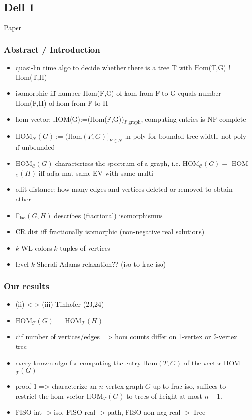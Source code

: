 \subsection{Dell 1}
Paper \cite{dell-1}

\subsubsection{Abstract / Introduction}

\begin{itemize}
    \item quasi-lin time algo to decide whether there is a tree T with Hom(T,G) != Hom(T,H)
    \item isomorphic iff number Hom(F,G) of hom from F to G equals number Hom(F,H) of hom from F to H
    \item hom vector: HOM(G):=(Hom(F,G))$_{F\text{ graph}}$, computing entries is NP-complete 
    \item HOM$_{\mathcal{F}}(G):=($Hom$(F,G))_{F\in\mathcal{F}}$ in poly for bounded tree width, not poly if unbounded
    \item HOM$_{\mathcal{C}}(G)$ characterizes the spectrum of a graph, i.e. HOM$_{\mathcal{C}}(G)=$ HOM$_{\mathcal{C}}(H)$ iff adja mat same EV with same multi
    \item edit distance: how many edges and vertices deleted or removed to obtain other
    \item F$_{\text{iso}}(G,H)$ describes (fractional) isomorphismus
    \item CR dist iff fractionally isomorphic (non-negative real solutions)
    \item $k$-WL colors $k$-tuples of vertices
    \item level-$k$-Sherali-Adams relaxation?? (iso to frac iso)
\end{itemize}

\subsubsection{Our results}

\begin{itemize}
    \item (ii) <-> (iii) Tinhofer (23,24)
    \item HOM$_{\mathcal{T}}(G)=$ HOM$_{\mathcal{T}}(H)$
    \item dif number of vertices/edges => hom counts differ on 1-vertex or 2-vertex tree 
    \item every known algo for computing the entry Hom$(T,G)$ of the vector HOM$_{\mathcal{T}}(G)$
    \item proof 1 => characterize an $n$-vertex graph $G$ up to frac iso, suffices to restrict the hom vector HOM$_{\mathcal{T}}(G)$ to trees of height at most $n-1$.
    \item FISO int -> iso, FISO real -> path, FISO non-neg real -> Tree
\end{itemize}

